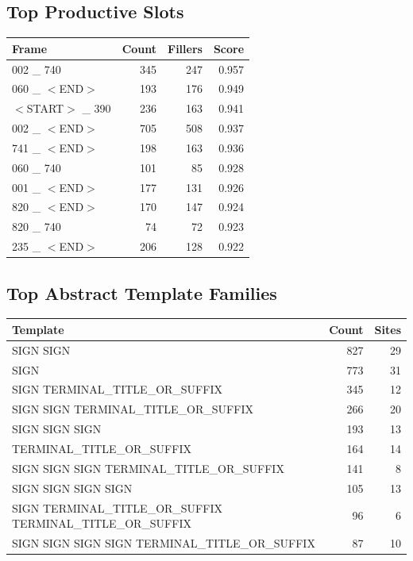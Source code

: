 \documentclass[11pt,a4paper]{article}
\begin{document}
\subsection*{Top Productive Slots}
\begin{center}
\begin{tabular}{lrrr}
\toprule
\textbf{Frame} & \textbf{Count} & \textbf{Fillers} & \textbf{Score} \\
\midrule
002 \_ 740 & 345 & 247 & 0.957 \\
060 \_ $<$END$>$ & 193 & 176 & 0.949 \\
$<$START$>$ \_ 390 & 236 & 163 & 0.941 \\
002 \_ $<$END$>$ & 705 & 508 & 0.937 \\
741 \_ $<$END$>$ & 198 & 163 & 0.936 \\
060 \_ 740 & 101 & 85 & 0.928 \\
001 \_ $<$END$>$ & 177 & 131 & 0.926 \\
820 \_ $<$END$>$ & 170 & 147 & 0.924 \\
820 \_ 740 & 74 & 72 & 0.923 \\
235 \_ $<$END$>$ & 206 & 128 & 0.922 \\
\bottomrule
\end{tabular}
\end{center}
\subsection*{Top Abstract Template Families}
\begin{center}
\begin{tabular}{p{}rr}
\toprule
\textbf{Template} & \textbf{Count} & \textbf{Sites} \\
\midrule
SIGN SIGN & 827 & 29 \\
SIGN & 773 & 31 \\
SIGN TERMINAL\_TITLE\_OR\_SUFFIX & 345 & 12 \\
SIGN SIGN TERMINAL\_TITLE\_OR\_SUFFIX & 266 & 20 \\
SIGN SIGN SIGN & 193 & 13 \\
TERMINAL\_TITLE\_OR\_SUFFIX & 164 & 14 \\
SIGN SIGN SIGN TERMINAL\_TITLE\_OR\_SUFFIX & 141 & 8 \\
SIGN SIGN SIGN SIGN & 105 & 13 \\
SIGN TERMINAL\_TITLE\_OR\_SUFFIX TERMINAL\_TITLE\_OR\_SUFFIX & 96 & 6 \\
SIGN SIGN SIGN SIGN TERMINAL\_TITLE\_OR\_SUFFIX & 87 & 10 \\
\bottomrule
\end{tabular}
\end{center}
\end{document}
